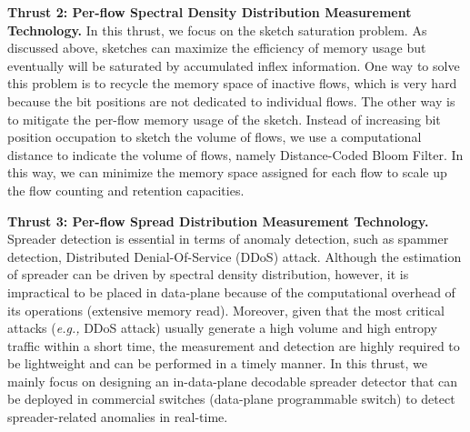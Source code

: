 \documentclass{NSF}
\newcommand{\BfPara}[1]{{\noindent\textbf{#1.}}\xspace}
\newcommand{\eg}{{\em e.g.,}\xspace}
\begin{document}

\BfPara{Thrust 2: Per-flow Spectral Density Distribution Measurement Technology} 
In this thrust, we focus on the sketch saturation problem. As discussed above, sketches can maximize the efficiency of memory usage but eventually will be saturated by accumulated inflex information. One way to solve this problem is to recycle the memory space of inactive flows, which is very hard because the bit positions are not dedicated to individual flows. The other way is to mitigate the per-flow memory usage of the sketch. Instead of increasing bit position occupation to sketch the volume of flows, we use a computational distance to indicate the volume of flows, namely Distance-Coded Bloom Filter. In this way, we can minimize the memory space assigned for each flow to scale up the flow counting and retention capacities.

\BfPara{Thrust 3: Per-flow Spread Distribution Measurement Technology}
Spreader detection is essential in terms of anomaly detection, such as spammer detection, Distributed Denial-Of-Service (DDoS) attack. Although the estimation of spreader can be driven by spectral density distribution, however, it is impractical to be placed in data-plane because of the computational overhead of its operations (extensive memory read). Moreover, given that the most critical attacks (\eg DDoS attack) usually generate a high volume and high entropy traffic within a short time, the measurement and detection are highly required to be lightweight and can be performed in a timely manner. In this thrust, we mainly focus on designing an in-data-plane decodable spreader detector that can be deployed in commercial switches (data-plane programmable switch) to detect spreader-related anomalies in real-time. 
\end{document}
